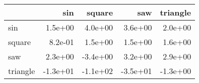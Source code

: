 \begin{tabular}{lrrrr}
\toprule
{} &      sin &   square &      saw &  triangle \\
\midrule
sin      &  1.5e+00 &  4.0e+00 &  3.6e+00 &   2.0e+00 \\
square   &  8.2e-01 &  1.5e+00 &  1.5e+00 &   1.6e+00 \\
saw      &  2.3e+00 & -3.4e+00 &  3.2e+00 &   2.9e+00 \\
triangle & -1.3e+01 & -1.1e+02 & -3.5e+01 &  -1.3e+00 \\
\bottomrule
\end{tabular}
